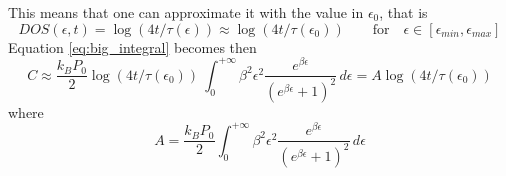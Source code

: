 \documentclass{article}
\begin{document}
This means that one can approximate it with the value in $\epsilon_0$, that is
\begin{equation*}
    DOS(\epsilon, t) = \log(4t/\tau(\epsilon)) \approx \log(4t/\tau(\epsilon_0)) \qquad \text{for} \quad \epsilon \in [\epsilon_{min}, \epsilon_{max}]
\end{equation*}
Equation \ref{eq:big_integral} becomes then 
\begin{equation}
    C \approx \frac{k_BP_0}{2} \log(4t/\tau(\epsilon_0)) \ \int_0^{+\infty} \beta^2\epsilon^2 \frac{e^{\beta\epsilon}}{(e^{\beta\epsilon}+1)^2} \, d\epsilon =
    A \log(4t/\tau(\epsilon_0))
\end{equation}
where 
\begin{equation*}
    A = \frac{k_BP_0}{2} \int_0^{+\infty} \beta^2\epsilon^2 \frac{e^{\beta\epsilon}}{(e^{\beta\epsilon}+1)^2} \, d\epsilon
\end{equation*}
\end{document}
